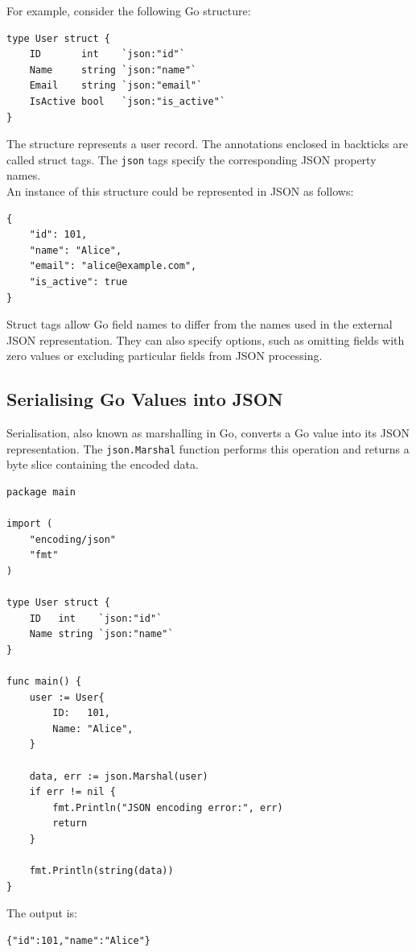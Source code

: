 For example, consider the following Go structure:

\begin{lstlisting}
type User struct {
    ID       int    `json:"id"`
    Name     string `json:"name"`
    Email    string `json:"email"`
    IsActive bool   `json:"is_active"`
}
\end{lstlisting}

The structure represents a user record. The annotations enclosed in backticks are called struct tags. The \texttt{json} tags specify the corresponding JSON property names.\\

An instance of this structure could be represented in JSON as follows:

\begin{lstlisting}
{
    "id": 101,
    "name": "Alice",
    "email": "alice@example.com",
    "is_active": true
}
\end{lstlisting}

Struct tags allow Go field names to differ from the names used in the external JSON representation. They can also specify options, such as omitting fields with zero values or excluding particular fields from JSON processing.

\subsection{Serialising Go Values into JSON}

Serialisation, also known as marshalling in Go, converts a Go value into its JSON representation. The \texttt{json.Marshal} function performs this operation and returns a byte slice containing the encoded data.

\begin{lstlisting}
package main

import (
    "encoding/json"
    "fmt"
)

type User struct {
    ID   int    `json:"id"`
    Name string `json:"name"`
}

func main() {
    user := User{
        ID:   101,
        Name: "Alice",
    }

    data, err := json.Marshal(user)
    if err != nil {
        fmt.Println("JSON encoding error:", err)
        return
    }

    fmt.Println(string(data))
}
\end{lstlisting}

The output is:

\begin{lstlisting}
{"id":101,"name":"Alice"}
\end{lstlisting}

